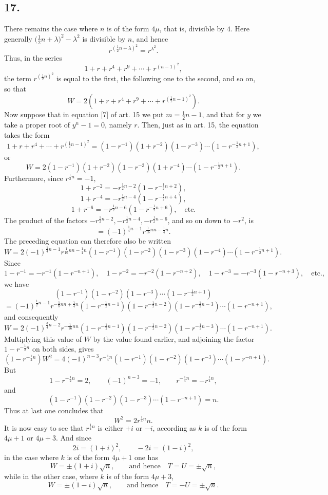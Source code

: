 \documentclass[12pt]{article}
\begin{document}
\subsection*{17.}

There remains the case where $n$ is of the form $4\mu$, that is, divisible by $4$. Here generally $\bigl(\tfrac12 n+\lambda\bigr)^2-\lambda^2$ is divisible by $n$, and hence
\[
r^{(\frac12 n+\lambda)^2}=r^{\lambda^2}.
\]
Thus, in the series
\[
1+r+r^4+r^9+\cdots+r^{(n-1)^2},
\]
the term $r^{(\frac12 n)^2}$ is equal to the first, the following one to the second, and so on, so that
\[
W=2\left(1+r+r^4+r^9+\cdots+r^{(\frac12 n-1)^2}\right).
\]
Now suppose that in equation [7] of art. 15 we put $m=\tfrac12 n-1$, and that for $y$ we take a proper root of $y^n-1=0$, namely $r$. Then, just as in art. 15, the equation takes the form
\[
1+r+r^4+\cdots+r^{(\frac12 n-1)^2}
=(1-r^{-1})(1+r^{-2})(1-r^{-3})\cdots(1-r^{-\frac12n+1}),
\]
or
\[
W=2(1-r^{-1})(1+r^{-2})(1-r^{-3})(1+r^{-4})\cdots(1-r^{-\frac12 n+1}). \tag{8}
\]
Furthermore, since $r^{\frac12 n}=-1$,
\[
1+r^{-2}=-r^{\frac12 n-2}(1-r^{-\frac12 n+2}),
\]
\[
1+r^{-4}=-r^{\frac12 n-4}(1-r^{-\frac12 n+4}),
\]
\[
1+r^{-6}=-r^{\frac12 n-6}(1-r^{-\frac12 n+6}),\quad\text{etc.}
\]
The product of the factors $-r^{\frac12n-2},-r^{\frac12n-4},-r^{\frac12n-6}$, and so on down to $-r^2$, is
\[
=(-1)^{\frac14n-1}r^{\frac1{16}nn-\frac14n}.
\]
The preceding equation can therefore also be written
\[
W=2(-1)^{\frac14 n-1}r^{\frac1{16}nn-\frac14n}
(1-r^{-1})(1-r^{-2})(1-r^{-3})(1-r^{-4})\cdots(1-r^{-\frac12n+1}).
\]
Since
\[
1-r^{-1}=-r^{-1}(1-r^{-n+1}),\quad
1-r^{-2}=-r^{-2}(1-r^{-n+2}),\quad
1-r^{-3}=-r^{-3}(1-r^{-n+3}),\quad\text{etc.},
\]
we have
\[
(1-r^{-1})(1-r^{-2})(1-r^{-3})\cdots(1-r^{-\frac12n+1})
\]
\[
=(-1)^{\frac12 n-1}r^{-\frac18 nn+\frac14 n}
(1-r^{-\frac12n-1})(1-r^{-\frac12n-2})(1-r^{-\frac12n-3})\cdots(1-r^{-n+1}),
\]
and consequently
\[
W=2(-1)^{\frac34 n-2}r^{-\frac1{16}nn}
(1-r^{-\frac12n-1})(1-r^{-\frac12n-2})(1-r^{-\frac12n-3})\cdots(1-r^{-n+1}).
\]
Multiplying this value of $W$ by the value found earlier, and adjoining the factor $1-r^{-\frac12n}$ on both sides, gives
\[
(1-r^{-\frac12 n})W^2
=4(-1)^{n-3}r^{-\frac14n}(1-r^{-1})(1-r^{-2})(1-r^{-3})\cdots(1-r^{-n+1}).
\]
But
\[
1-r^{-\frac12n}=2,\qquad (-1)^{n-3}=-1,\qquad r^{-\frac14n}=-r^{\frac14n},
\]
and
\[
(1-r^{-1})(1-r^{-2})(1-r^{-3})\cdots(1-r^{-n+1})=n.
\]
Thus at last one concludes that
\[
W^2=2r^{\frac14 n}n. \tag{9}
\]
It is now easy to see that $r^{\frac14 n}$ is either $+i$ or $-i$, according as $k$ is of the form $4\mu+1$ or $4\mu+3$. And since
\[
2i=(1+i)^2,\qquad -2i=(1-i)^2,
\]
in the case where $k$ is of the form $4\mu+1$ one has
\[
W=\pm(1+i)\sqrt n,\qquad\text{and hence}\quad T=U=\pm\sqrt n,
\]
while in the other case, where $k$ is of the form $4\mu+3$,
\[
W=\pm(1-i)\sqrt n,\qquad\text{and hence}\quad T=-U=\pm\sqrt n.
\]
\end{document}
